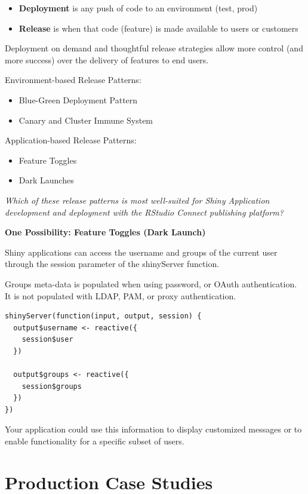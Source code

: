 \documentclass[]{book}
\providecommand{\tightlist}{%
  \setlength{\itemsep}{0pt}\setlength{\parskip}{0pt}}
\theoremstyle{definition}
\theoremstyle{definition}
\theoremstyle{definition}
\theoremstyle{remark}
\begin{document}
\begin{itemize}
\tightlist
\item
  \textbf{Deployment} is any push of code to an environment (test, prod)
\item
  \textbf{Release} is when that code (feature) is made available to
  users or customers
\end{itemize}

Deployment on demand and thoughtful release strategies allow more
control (and more success) over the delivery of features to end users.

Environment-based Release Patterns:

\begin{itemize}
\tightlist
\item
  Blue-Green Deployment Pattern
\item
  Canary and Cluster Immune System
\end{itemize}

Application-based Release Patterns:

\begin{itemize}
\tightlist
\item
  Feature Toggles
\item
  Dark Launches
\end{itemize}

\emph{Which of these release patterns is most well-suited for Shiny
Application development and deployment with the RStudio Connect
publishing platform?}

\textbf{One Possibility: Feature Toggles (Dark Launch)}

Shiny applications can access the username and groups of the current
user through the session parameter of the shinyServer function.

Groups meta-data is populated when using password, or OAuth
authentication. It is not populated with LDAP, PAM, or proxy
authentication.

\begin{verbatim}
shinyServer(function(input, output, session) {
  output$username <- reactive({
    session$user
  })
  
  output$groups <- reactive({
    session$groups
  })
})
\end{verbatim}

Your application could use this information to display customized
messages or to enable functionality for a specific subset of users.

\hypertarget{production-case-studies}{%
\chapter{Production Case Studies}\label{production-case-studies}}
\end{document}
